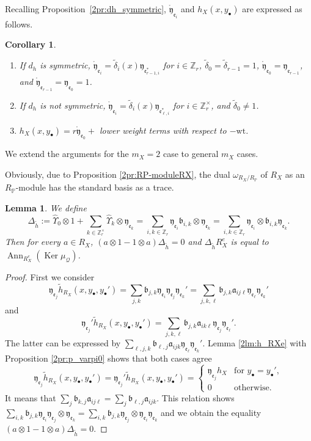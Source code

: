 \documentclass[pdftex]{sigma}
\def\ZZ{{\mathbb Z}}
\def\PP{{\mathbb P}}
\def\cQ{{\mathcal Q}}
\def\fa{{\mathfrak a}}
\def\fb{{\mathfrak b}}
\def\fe{{\mathfrak e}}
\def\fy{{\mathfrak y}}
\def\th{{\widetilde h}}
\def\tdelta{{\widetilde \delta}}
\def\hUpsilon{{\widehat \Upsilon}}
\def\rfy{{\mathring{\mathfrak y}}}
\def\Ker{\operatorname{Ker}}
\def\Ann{\operatorname{Ann}}
\def\wt{{\mathrm {wt}}}
\numberwithin{equation}{section}
\newtheorem{Corollary}[Theorem]{Corollary}
\newtheorem{Lemma}[Theorem]{Lemma}
\begin{document}
Recalling Proposition~\ref{2pr:dh_symmetric}, $\rfy_{\fe_i}$ and $h_{X}(x, y_{\bullet})$ are expressed as follows.
\begin{Corollary}\label{2cr:phi_h0}\quad
\begin{enumerate}\itemsep=0pt
\item[$1.$]
If $d_h$ is symmetric, $\rfy_{\fe_i}=\tdelta_i(x)\fy_{\fe_{r-1,i}^*}$
for $i\in \ZZ_r$,
$\tdelta_0=\tdelta_{r-1}=1$,
$\rfy_{\fe_0}=\fy_{\fe_{r-1}}$, and
$\rfy_{\fe_{r-1}}=\fy_{\fe_0}=1$.

\item[$2.$]
If $d_h$ is not symmetric, $\rfy_{\fe_i}=\tdelta_i(x)\fy_{\fe_{\ell,i}^*}$ for $i\in \ZZ_r^\times$, and $\tdelta_0\neq 1$.

\item[$3.$] $h_{X}(x, y_{\bullet})=r \rfy_{\fe_0}+$ lower weight terms with respect to $-\wt$.
\end{enumerate}
\end{Corollary}

We extend the arguments for the $m_X=2$ case to general $m_X$ cases.

Obviously, due to Proposition \ref{2pr:RP-moduleRX}, the dual $\omega_{R_X/R_\PP}$ of $R_X$ as an $R_\PP$-module has the standard basis as a trace.

\begin{Lemma}\label{2lm:Delta_th}
We define
\[
\Delta_{\th}:= \hUpsilon_{0}\otimes 1
+\sum_{k\in \ZZ_r^\times}
 \hUpsilon_{k}\otimes \fy_{\fe_k}
=\sum_{i,k\in \ZZ_r}\fy_{\fe_i}\fb_{i,k}\otimes \fy_{\fe_k}
=\sum_{i,k\in \ZZ_r}\fy_{\fe_i}\otimes\fb_{i,k} \fy_{\fe_k}.
\]
Then for every $a\in R_X$, $(a\otimes 1-1\otimes a)\Delta_{\th}=0$
and $\Delta_{\th}R_X^e$ is equal to $\Ann_{R_X^e}(\Ker \mu_\cQ)$.
\end{Lemma}

\begin{proof}
First we consider
\[
\fy_{\fe_j}\th_{R_X}(x, y_{\bullet}, y_{\bullet}') =\sum_{j,k}\fb_{j,k}\fy_{\fe_i}\fy_{\fe_j}\fy_{\fe_k}'=\sum_{j,k,\ell}\fb_{j,k}\fa_{i j\ell}\fy_{\fe_\ell}\fy_{\fe_k}'
\] and
\[ \fy_{\fe_j}'\th_{R_X}(x, y_{\bullet}, y_{\bullet}') =\sum_{j,k,\ell}\fb_{j,k}\fa_{i k\ell}\fy_{\fe_j}\fy_{\fe_\ell}'.\]
The latter can be expressed by $\sum_{\ell,j,k}\fb_{\ell,j}\fa_{i j k}\fy_{\fe_\ell}\fy_{\fe_k}'$.
Lemma \ref{2lm:h_RXe} with Proposition \ref{2pr:p_varpi0} shows that both cases agree
\[
\fy_{\fe_j}\th_{R_X}(x, y_{\bullet}, y_{\bullet}')
=\fy_{\fe_j}'\th_{R_X}(x, y_{\bullet}, y_{\bullet}')=
\begin{cases}
\fy_{\fe_j}h_X & \text{for } y_{\bullet} = y_{\bullet}',\\
0 & \text{otherwise}.
\end{cases}
\]
It means that $\sum_j \fb_{k,j}\fa_{i j\ell}=\sum_j \fb_{\ell,j}\fa_{i j k}$.
This relation shows
$\sum_{i,k}\fb_{j,k}\fy_{\fe_i}\fy_{\fe_j}\otimes \fy_{\fe_k}=\sum_{i,k}\fb_{j,k}\fy_{\fe_j}\otimes\fy_{\fe_i} \fy_{\fe_k}$
and we obtain the equality $(a\otimes 1-1\otimes a)\Delta_{\th}=0$.
\end{proof}
\end{document}
